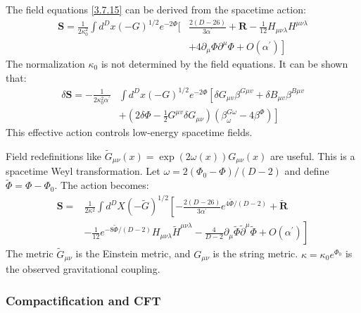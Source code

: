 The field equations \eqref{3.7.15} can be derived from the spacetime action:
\begin{equation}
	\begin{aligned}
		\mathbf{S}=\frac{1}{2 \kappa_{0}^{2}} \int d^{D} x(-G)^{1 / 2} e^{-2 \Phi}[& \frac{2(D-26)}{3 \alpha^{\prime}}+\mathbf{R}-\frac{1}{12} H_{\mu \nu \lambda} H^{\mu \nu \lambda} \\
		&\left.+4 \partial_{\mu} \Phi \partial^{\mu} \Phi+O\left(\alpha^{\prime}\right)\right]\label{3.7.20}
	\end{aligned}
\end{equation}
The normalization $\kappa_0$ is not determined by the field equations. It can be shown that:
\begin{equation}
	\begin{aligned}
		\delta \mathbf{S}=-\frac{1}{2 \kappa_{0}^{2} \alpha^{\prime}} & \int d^{D} x(-G)^{1 / 2} e^{-2 \Phi}\left[\delta G_{\mu v} \beta^{G \mu v}+\delta B_{\mu v} \beta^{B \mu v}\right.\\
		&\left.+\left(2 \delta \Phi-\frac{1}{2} G^{\mu v} \delta G_{\mu \nu}\right)\left(\beta_{\omega}^{G \omega}-4 \beta^{\Phi}\right)\right]
	\end{aligned}
\end{equation}
This effective action controls low-energy spacetime fields.

Field redefinitions like $\tilde{G}_{\mu \nu}(x)=\exp (2 \omega(x)) G_{\mu \nu}(x)$ are useful. This is a spacetime Weyl transformation. Let $\omega=2\left(\Phi_{0}-\Phi\right) /(D-2)$ and define $\tilde{\Phi}=\Phi-\Phi_{0}$. The action becomes:
\begin{equation}
	\begin{aligned}
		\mathbf{S}=& \frac{1}{2 \kappa^{2}} \int d^{D} X(-\tilde{G})^{1 / 2}\left[-\frac{2(D-26)}{3 \alpha^{\prime}} e^{4 \tilde{\Phi} /(D-2)}+\tilde{\mathbf{R}}\right.\\
		&\left.-\frac{1}{12} e^{-8 \tilde{\Phi} /(D-2)} H_{\mu \nu \lambda} \tilde{H}^{\mu \nu \lambda}-\frac{4}{D-2} \partial_{\mu} \tilde{\Phi} \tilde{\partial}^{\mu} \tilde{\Phi}+O\left(\alpha^{\prime}\right)\right]
	\end{aligned}\label{3.7.25}
\end{equation}
The metric $\tilde{G}_{\mu\nu}$ is the Einstein metric, and $G_{\mu\nu}$ is the string metric. $\kappa=\kappa_{0} e^{\Phi_{0}}$ is the observed gravitational coupling.

\subsubsection*{\Large Compactification and CFT}

